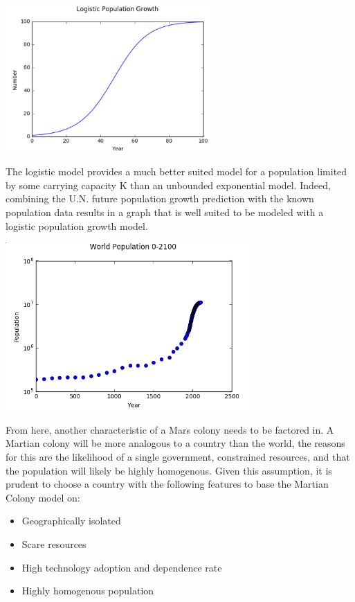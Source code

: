 \documentclass[12pt]{article}
\begin{document}
\begin{minipage}{\textwidth}
		\centering
		\includegraphics[width=0.6\textwidth]{logistic}
\end{minipage}\hfill




The logistic model provides a much better suited model for a population limited by some carrying capacity K than an unbounded exponential model. Indeed, combining the U.N. future population growth prediction\cite{un} with the known population data results in a graph that is well suited to be modeled with a logistic population growth model.


\begin{minipage}{\textwidth}
		\centering
		\includegraphics[width=0.7\textwidth]{futureWorldPop}
\end{minipage}\hfill




From here, another characteristic of a Mars colony needs to be factored in. A Martian colony will be more analogous to a country than the world, the reasons for this are the likelihood of a  single government, constrained resources, and that the population will likely be highly homogenous. Given this assumption, it is prudent to choose a country with the following features to base the Martian Colony model on: 
\begin{itemize}  
\item Geographically isolated
\item Scare resources
\item High technology adoption and dependence rate
\item Highly homogenous population
\end{itemize}
\end{document}
